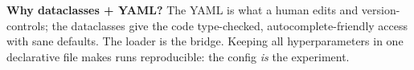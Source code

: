 \begin{teacher}
\textbf{Why dataclasses + YAML?} The YAML is what a human edits and version-controls; the
dataclasses give the code type-checked, autocomplete-friendly access with sane defaults.
The loader is the bridge. Keeping all hyperparameters in one declarative file makes runs
reproducible: the config \emph{is} the experiment.
\end{teacher}
